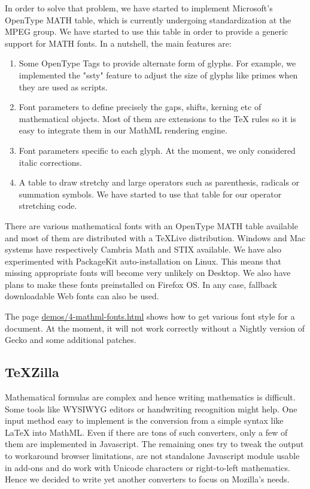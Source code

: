 In order to solve that problem, we have started to implement Microsoft's
OpenType MATH table, which is currently undergoing standardization at the
MPEG group. We have started to use this table in order to provide a generic
support for MATH fonts. In a nutshell, the main features are:

\begin{enumerate}

\item Some OpenType Tags to provide alternate form of glyphs. For example,
  we implemented the "ssty" feature to adjust the size of glyphs like primes
  when they are used as scripts.

\item Font parameters to define precisely the gaps, shifts, kerning etc of
  mathematical objects. Most of them are extensions to the TeX rules so it
  is easy to integrate them in our MathML rendering engine.

\item Font parameters specific to each glyph. At the moment, we only considered
  italic corrections.

\item A table to draw stretchy and large operators such as parenthesis,
  radicals or summation symbols. We have started to use that table for our
  operator stretching code.

\end{enumerate}

There are various mathematical fonts with an OpenType MATH table available and
most of them are distributed with a TeXLive distribution. Windows and Mac
systems have respectively Cambria Math and STIX available. We have also
experimented with PackageKit auto-installation on Linux. This means that
missing appropriate fonts will become very unlikely on Desktop. We also have
plans to make these fonts preinstalled on Firefox OS. In any case, fallback
downloadable Web fonts can also be used.

The page \href{http://fred-wang.github.io/MathUI2014/demos/4-mathml-fonts.html}{demos/4-mathml-fonts.html} shows how to get various font style for
a document. At the moment, it will not work correctly without a Nightly
version of Gecko and some additional patches.

\subsection{TeXZilla}

Mathematical formulas are complex and hence writing mathematics is difficult.
Some tools like WYSIWYG editors or handwriting recognition might help. One
input method easy to implement is the conversion from a simple syntax like
LaTeX into MathML. Even if there are tons of such converters, only a few of
them are implemented in Javascript. The remaining ones try to tweak the output
to workaround browser limitations, are not standalone Javascript module usable
in add-ons and do work with Unicode characters or right-to-left
mathematics. Hence we decided to write yet another converters to focus on
Mozilla's needs.

